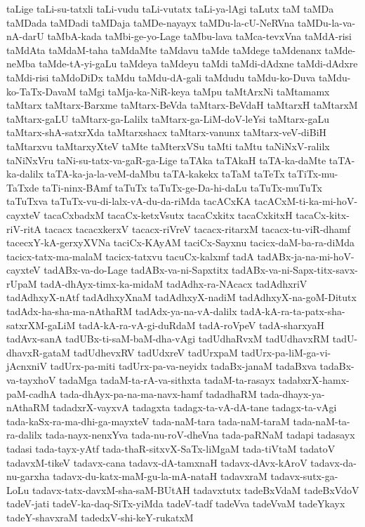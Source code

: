 {taLige
taLi-su-tatxli
taLi-vudu
taLi-vutatx
taLi-ya-lAgi
taLutx
taM
taMDa
taMDada
taMDadi
taMDaja
taMDe-nayayx
taMDu-la-cU-NeRVna
taMDu-la-va-nA-darU
taMbA-kada
taMbi-ge-yo-Lage
taMbu-lava
taMca-tevxVna
taMdA-risi
taMdAta
taMdaM-taha
taMdaMte
taMdavu
taMde
taMdege
taMdenanx
taMde-neMba
taMde-tA-yi-gaLu
taMdeya
taMdeyu
taMdi
taMdi-dAdxne
taMdi-dAdxre
taMdi-risi
taMdoDiDx
taMdu
taMdu-dA-gali
taMdudu
taMdu-ko-Duva
taMdu-ko-TaTx-DavaM
taMgi
taMja-ka-NiR-keya
taMpu
taMtArxNi
taMtamamx
taMtarx
taMtarx-Barxme
taMtarx-BeVda
taMtarx-BeVdaH
taMtarxH
taMtarxM
taMtarx-gaLU
taMtarx-ga-Lalilx
taMtarx-ga-LiM-doV-leYsi
taMtarx-gaLu
taMtarx-shA-satxrXda
taMtarxshacx
taMtarx-vanunx
taMtarx-veV-diBiH
taMtarxvu
taMtarxyXteV
taMte
taMterxVSu
taMti
taMtu
taNiNxV-ralilx
taNiNxVru
taNi-su-tatx-va-gaR-ga-Lige
taTAka
taTAkaH
taTA-ka-daMte
taTA-ka-dalilx
taTA-ka-ja-la-veM-daMbu
taTA-kakekx
taTaM
taTeTx
taTiTx-mu-TaTxde
taTi-ninx-BAmf
taTuTx
taTuTx-ge-Da-hi-daLu
taTuTx-muTuTx
taTuTxva
taTuTx-vu-di-lalx-vA-du-da-riMda
tacACxKA
tacACxM-ti-ka-mi-hoV-cayxteV
tacaCxbadxM
tacaCx-ketxVsutx
tacaCxkitx
tacaCxkitxH
tacaCx-kitx-riV-ritA
tacacx
tacacxkerxV
tacacx-riVreV
tacacx-ritarxM
tacacx-tu-viR-dhamf
tacecxY-kA-gerxyXVNa
taciCx-KAyAM
taciCx-Sayxnu
tacicx-daM-ba-ra-diMda
tacicx-tatx-ma-malaM
tacicx-tatxvu
tacuCx-kalxmf
tadA
tadABx-ja-na-mi-hoV-cayxteV
tadABx-va-do-Lage
tadABx-va-ni-Sapxtitx
tadABx-va-ni-Sapx-titx-savx-rUpaM
tadA-dhAyx-timx-ka-midaM
tadAdhx-ra-NAcacx
tadAdhxriV
tadAdhxyX-nAtf
tadAdhxyXnaM
tadAdhxyX-nadiM
tadAdhxyX-na-goM-Ditutx
tadAdx-ha-sha-ma-nAthaRM
tadAdx-ya-na-vA-dalilx
tadA-kA-ra-ta-patx-sha-satxrXM-gaLiM
tadA-kA-ra-vA-gi-duRdaM
tadA-roVpeV
tadA-sharxyaH
tadAvx-sanA
tadUBx-ti-saM-baM-dha-vAgi
tadUdhaRvxM
tadUdhavxRM
tadU-dhavxR-gataM
tadUdhevxRV
tadUdxreV
tadUrxpaM
tadUrx-pa-liM-ga-vi-jAcnxniV
tadUrx-pa-miti
tadUrx-pa-va-neyidx
tadaBx-janaM
tadaBxva
tadaBx-va-tayxhoV
tadaMga
tadaM-ta-rA-va-sithxta
tadaM-ta-rasayx
tadabxrX-hamx-paM-cadhA
tada-dhAyx-pa-na-ma-navx-hamf
tadadhaRM
tada-dhayx-ya-nAthaRM
tadadxrX-vayxvA
tadagxta
tadagx-ta-vA-dA-tane
tadagx-ta-vAgi
tada-kaSx-ra-ma-dhi-ga-mayxteV
tada-naM-tara
tada-naM-taraM
tada-naM-ta-ra-dalilx
tada-nayx-nenxYva
tada-nu-roV-dheVna
tada-paRNaM
tadapi
tadasayx
tadasi
tada-tayx-yAtf
tada-thaR-sitxvX-SaTx-liMgaM
tada-tiVtaM
tadatoV
tadavxM-tikeV
tadavx-cana
tadavx-dA-tamxnaH
tadavx-dAvx-kAroV
tadavx-da-nu-garxha
tadavx-du-katx-maM-gu-la-mA-nataH
tadavxraM
tadavx-sutx-ga-LoLu
tadavx-tatx-davxM-sha-saM-BUtAH
tadavxtutx
tadeBxVdaM
tadeBxVdoV
tadeV-jati
tadeV-ka-daq-SiTx-yiMda
tadeV-tadf
tadeVva
tadeVvaM
tadeYkayx
tadeY-shavxraM
tadedxV-shi-keY-rukatxM
}

